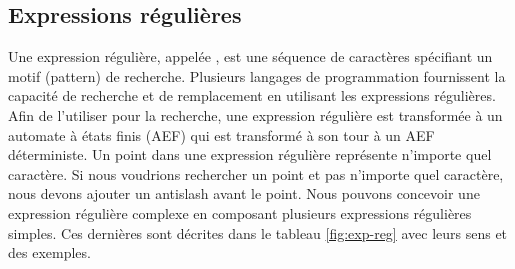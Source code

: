 \documentclass{KodeBook}
\begin{document}
\subsection{Expressions régulières}

Une expression régulière, appelée , est une séquence de caractères spécifiant un motif (pattern) de recherche.
Plusieurs langages de programmation fournissent la capacité de recherche et de remplacement en utilisant les expressions régulières. 
Afin de l'utiliser pour la recherche, une expression régulière est transformée à un automate à états finis (AEF) qui est transformé à son tour à un AEF déterministe.
Un point dans une expression régulière représente n'importe quel caractère.
Si nous voudrions rechercher un point et pas n'importe quel caractère, nous devons ajouter un antislash avant le point.
Nous pouvons concevoir une expression régulière complexe en composant plusieurs expressions régulières simples.
Ces dernières sont décrites dans le tableau \ref{fig:exp-reg} avec leurs sens et des exemples.
\end{document}
